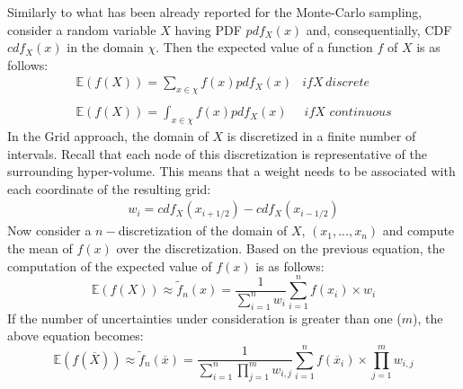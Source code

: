 Similarly to what has been already reported for the Monte-Carlo sampling, consider a random variable $X$ having PDF $pdf_{X}(x)$ and, consequentially, CDF $cdf_{X}(x)$ in the domain $\chi$. Then the expected value of a function $f$ of $X$ is as follows:
\begin{equation}
\begin{matrix}
\mathbb{E}(f(X)) =\sum_{x \in \chi} f(x)pdf_{X}(x) & if X \, discrete \\ 
\\ 
\mathbb{E}(f(X)) =\int_{x \in \chi} f(x)pdf_{X}(x) & \, if X \, \, continuous
\end{matrix}
\end{equation}
In the Grid approach, the domain of $X$ is discretized in a finite number of intervals. Recall that 
each node of this discretization is representative of the surrounding hyper-volume. This means that a weight 
needs to be associated with each coordinate of the resulting grid:
\begin{equation}
\begin{matrix}
  w_{i}= cdf_{X}(x_{i+1/2}) - cdf_{X}(x_{i-1/2})
\end{matrix}  
\end{equation}
Now consider 
a $n-$discretization of the domain of  $X$, $(x_{1},...,x_{n})$ and compute the mean of $f(x)$ over the discretization. Based on the previous equation, the computation of the expected value of $f(x)$ is as follows:
\begin{equation}
 \mathbb{E}(f(X)) \approx   \widetilde{f}_{n}(x) = \frac{1}{\sum_{i=1}^{n}w_{i}} \sum_{i=1}^{n} f(x_{i}) \times w_{i}
\end{equation}
If the number of uncertainties under consideration is greater than one ($m$), the above equation
becomes:
\begin{equation}
\mathbb{E}(f(\overline{X})) \approx   \widetilde{f}_{n}(\overline{x}) = \frac{1}{\sum_{i=1}^{n}\prod_{j=1}^{m}w_{i,j}} \sum_{i=1}^{n} f(\overline{x}_{i}) \times \prod_{j=1}^{m}w_{i,j}
\end{equation}

